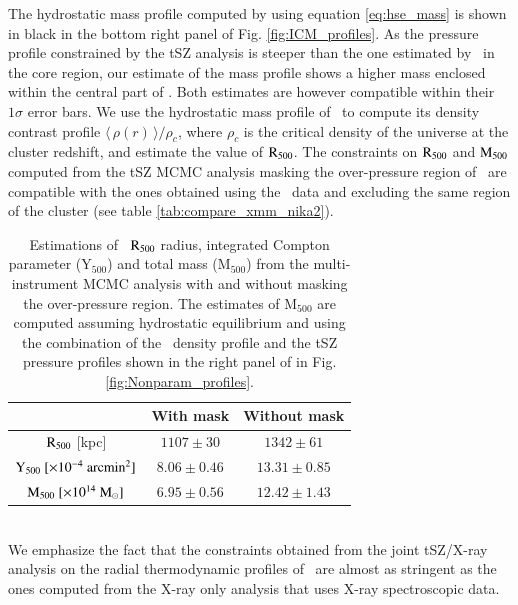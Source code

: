 \documentclass[traditabstract]{aa}
\begin{document}
\indent The hydrostatic mass profile computed by using equation \ref{eq:hse_mass} is shown in black in the bottom right panel of Fig. \ref{fig:ICM_profiles}. As the pressure profile constrained by the tSZ analysis is steeper than the one estimated by \xmm\ in the core region, our estimate of the mass profile shows a higher mass enclosed within the central part of \psz. Both estimates are however compatible within their $1\sigma$ error bars. We use the hydrostatic mass profile of \psz\ to compute its density contrast profile $\langle \, \rho(r) \, \rangle/\rho_c$, where $\rho_c$ is the critical density of the universe at the cluster redshift, and estimate the value of $\rm{R_{500}}$. The constraints on $\rm{R_{500}}$ and $\rm{M_{500}}$ computed from the tSZ MCMC analysis masking the over-pressure region of \psz\ are compatible with the ones obtained using the \xmm\ data and excluding the same region of the cluster (see table \ref{tab:compare_xmm_nika2}).
\begin{table}[h]
\begin{center}
\begin{tabular}{ccc}
\hline
\hline
 & \textbf{With mask} & \textbf{Without mask} \\
\hline
$\rm{R_{500}}$ [kpc] & $1107 \pm 30$ & $1342 \pm 61$\\
$\rm{Y_{500}}~[\mathrm{\times 10^{-4}~arcmin^2}]$ & $8.06 \pm 0.46$ & $13.31 \pm 0.85$ \\
$\rm{M_{500}}~[\mathrm{\times 10^{14}~M_{\odot}}]$ & $6.95 \pm 0.56$ & $12.42 \pm 1.43$ \\
\hline
\hline
\end{tabular}
\end{center}
\caption{{\footnotesize Estimations of \psz\ $\rm{R_{500}}$ radius, integrated Compton parameter ($\mathrm{Y_{500}}$) and total mass ($\mathrm{M_{500}}$) from the multi-instrument MCMC analysis with and without masking the over-pressure region. The estimates of $\mathrm{M_{500}}$ are computed assuming hydrostatic equilibrium and using the combination of the \xmm\ density profile and the tSZ pressure profiles shown in the right panel of in Fig. \ref{fig:Nonparam_profiles}.}}
\label{tab:Cluster_global}
\end{table}\\
We emphasize the fact that the constraints obtained from the joint tSZ/X-ray analysis on the radial thermodynamic profiles of \psz\ are almost as stringent as the ones computed from the X-ray only analysis that uses X-ray spectroscopic data.
\end{document}
